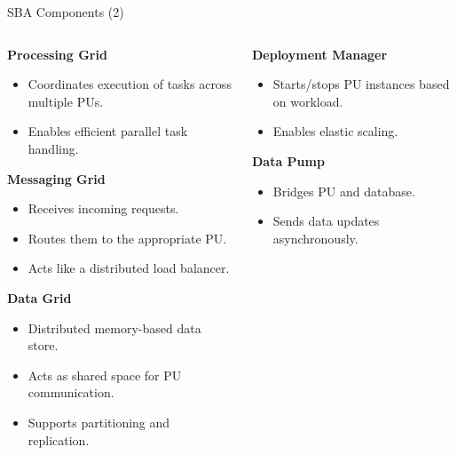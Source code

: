 \documentclass[aspectratio=169, table]{beamer}
\begin{document}
	\begin{frame}{SBA Components (2)}
		\vspace{20pt}
		\begin{columns}[t]
			\begin{column}{0.65\textwidth}
				\textbf{Processing Grid}
				\begin{itemize}
					\item Coordinates execution of tasks across multiple PUs.
					\item Enables efficient parallel task handling.
				\end{itemize}
				
				\textbf{Messaging Grid}
				\begin{itemize}
					\item Receives incoming requests.
					\item Routes them to the appropriate PU.
					\item Acts like a distributed load balancer.
				\end{itemize}
				
				\textbf{Data Grid}
				\begin{itemize}
					\item Distributed memory-based data store.
					\item Acts as shared space for PU communication.
					\item Supports partitioning and replication.
				\end{itemize}
			\end{column}
			
			\begin{column}{0.35\textwidth}
				\textbf{Deployment Manager}
				\begin{itemize}
					\item Starts/stops PU instances based on workload.
					\item Enables elastic scaling.
				\end{itemize}
				
				\textbf{Data Pump}
				\begin{itemize}
					\item Bridges PU and database.
					\item Sends data updates asynchronously.
				\end{itemize}
			\end{column}
		\end{columns}
	\end{frame}
	
\end{document}
